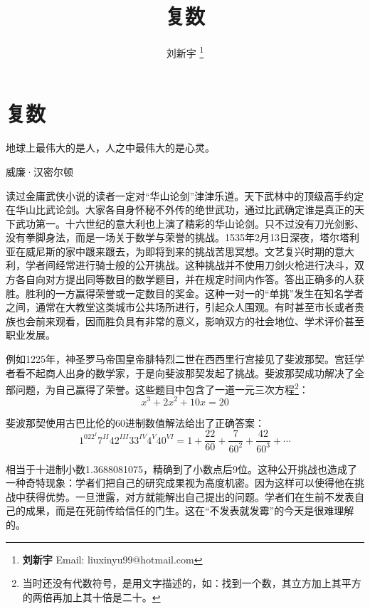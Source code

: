 \documentclass[b5paper]{ctexart}
\begin{document}
\title{复数}

\author{刘新宇
\thanks{{\bfseries 刘新宇} \newline
  Email: liuxinyu99@hotmail.com \newline}
  }

\maketitle
\fi


\ifx\wholebook\relax
\chapter{复数}
\fi

\epigraph{地球上最伟大的是人，人之中最伟大的是心灵。}{威廉·汉密尔顿}

读过金庸武侠小说的读者一定对“华山论剑”津津乐道。天下武林中的顶级高手约定在华山比武论剑。大家各自身怀秘不外传的绝世武功，通过比武确定谁是真正的天下武功第一。十六世纪的意大利也上演了精彩的华山论剑。只不过没有刀光剑影、没有拳脚身法，而是一场关于数学与荣誉的挑战。1535年2月13日深夜，塔尔塔利亚在威尼斯的家中踱来踱去，为即将到来的挑战苦思冥想。文艺复兴时期的意大利，学者间经常进行骑士般的公开挑战。这种挑战并不使用刀剑火枪进行决斗，双方各自向对方提出同等数目的数学题目，并在规定时间内作答。答出正确多的人获胜。胜利的一方赢得荣誉或一定数目的奖金。这种一对一的“单挑”发生在知名学者之间，通常在大教堂这类城市公共场所进行，引起众人围观。有时甚至市长或者贵族也会前来观看，因而胜负具有非常的意义，影响双方的社会地位、学术评价甚至职业发展。

例如1225年，神圣罗马帝国皇帝腓特烈二世在西西里行宫接见了斐波那契。宫廷学者看不起商人出身的数学家，于是向斐波那契发起了挑战。斐波那契成功解决了全部问题，为自己赢得了荣誉。这些题目中包含了一道一元三次方程\footnote{当时还没有代数符号，是用文字描述的，如：找到一个数，其立方加上其平方的两倍再加上其十倍是二十。}：\[x^3 + 2x^2 + 10x = 20\]

斐波那契使用古巴比伦的60进制数值解法给出了正确答案：
\[
1^022^{I}7^{II}42^{III}33^{IV}4^{V}40^{VI} = 1 + \frac{22}{60} + \frac{7}{60^2} + \frac{42}{60^3} + \dotsb
\]

相当于十进制小数1.3688081075，精确到了小数点后9位。这种公开挑战也造成了一种奇特现象：学者们把自己的研究成果视为高度机密。因为这样可以使得他在挑战中获得优势。一旦泄露，对方就能解出自己提出的问题。学者们在生前不发表自己的成果，而是在死前传给信任的门生。这在“不发表就发霉”的今天是很难理解的\cite{HanXueTao2012}。
\end{document}
